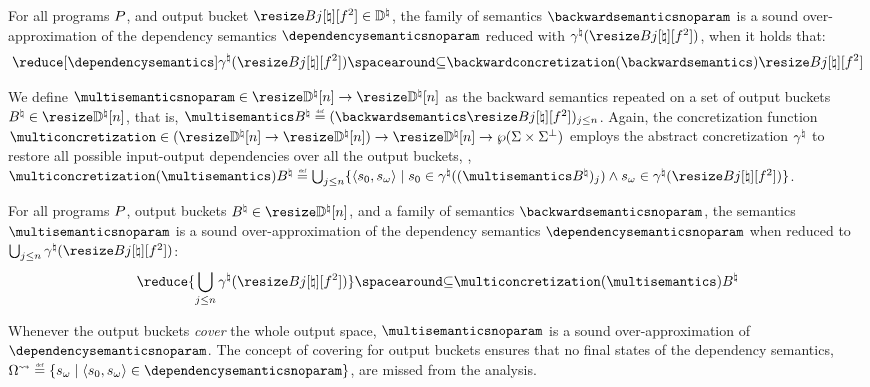 \begin{definition}\label{def:sound-over-approximation}
  For all programs $P$, and output bucket $\bucket\in\abstractdomain$, the family of semantics $\backwardsemanticsnoparam$ is a \textup{sound over-approximation} of the dependency semantics $\dependencysemanticsnoparam$ reduced with  $\abstractdomainconcretization(\bucket)$, when it holds that:
  \[\reduceddependencysemantics \SubseteQ \backwardconcretization(\backwardsemantics)\bucket\]
\end{definition}

We define
$\multisemanticsnoparam\in\multitype$ as the backward semantics repeated on a set of output buckets $\buckets\in\vectorbuckets$, that is, $\multisemantics\buckets \defeq (\backwardsemantics\bucket)_{j\le n}$.
Again, the concretization function $\multiconcretization\in(\multitype)\to\vectorbuckets\to\setof\pairofstates$ employs the abstract concretization $\gamma^\natural$ to restore all possible input-output dependencies over all the output buckets, \ie,
$\multiconcretization(\multisemantics)\buckets \defeq \bigsetjoin_{j\le n} \setdef{\inputoutputtuple{\defstate}}{\retrieveinput{\defstate}\in\abstractdomainconcretization((\multisemantics\buckets)_j)\land\retrieveoutput{\defstate}\in\abstractdomainconcretization(\bucket)}$.

\begin{lemma}\label{lm:sound-over-approximation-multi-bucket}
  For all programs $P$, output buckets $\buckets\in\vectorbuckets$, and a family of semantics $\backwardsemanticsnoparam$, the %
  semantics $\multisemanticsnoparam$ is a \textup{sound over-approximation} of the dependency semantics $\dependencysemanticsnoparam$ when reduced to $\bigsetjoin_{j\le n}\abstractdomainconcretization(\bucket)$:
  \[\reduce{\bigsetjoin_{j\le n}\abstractdomainconcretization(\bucket)} \SubseteQ \multiconcretization(\multisemantics)\buckets\]
\end{lemma}

Whenever the output buckets \textit{cover} the whole output space, $\multisemanticsnoparam$ is a sound over-approximation of $\dependencysemanticsnoparam$.
The concept of covering for output buckets ensures that no final states of the dependency semantics, \ie{} $\finalstatesdependency\defeq\setdef{\retrieveoutput{\defstate}}{\inputoutputtuple\defstate\in\dependencysemanticsnoparam}$, are missed from the analysis.

